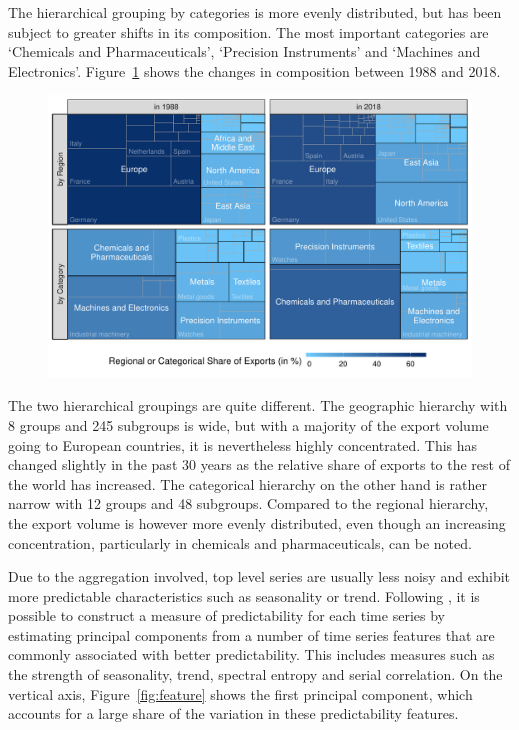 \documentclass[a4paper,fleqn,11pt]{article}
\begin{document}
The hierarchical grouping by categories is more evenly distributed, but has been subject to greater shifts in its composition. The most important categories are `Chemicals and Pharmaceuticals', `Precision Instruments' and `Machines and Electronics'. Figure~\ref{fig:treemap} shows the changes in composition between 1988 and 2018.

\begin{figure}[H]
	\includegraphics[width=\textwidth]{fig/fig_treemap}
	\label{fig:treemap}
\end{figure}

The two hierarchical groupings are quite different. The geographic hierarchy with 8 groups and 245 subgroups is wide, but with a majority of the export volume going to European countries, it is nevertheless highly concentrated. This has changed slightly in the past 30 years as the relative share of exports to the rest of the world has increased. The categorical hierarchy on the other hand is rather narrow with 12 groups and 48 subgroups. Compared to the regional hierarchy, the export volume is however more evenly distributed, even though an increasing concentration, particularly in chemicals and pharmaceuticals, can be noted.

Due to the aggregation involved, top level series are usually less noisy and exhibit more predictable characteristics such as seasonality or trend. Following \cite{Kang2017}, it is possible to construct a measure of predictability for each time series by estimating principal components from a number of time series features that are commonly associated with better predictability. This includes measures such as the strength of seasonality, trend, spectral entropy and serial correlation. On the vertical axis, Figure~\ref{fig:feature} shows the first principal component, which accounts for a large share of the variation in these predictability features.
\end{document}
